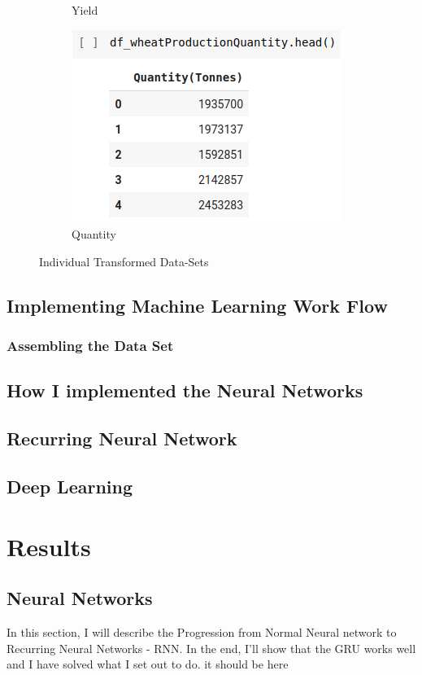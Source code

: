 \documentclass[
]{thesis-ekf}
\begin{document}
\begin{figure}
\begin{subfigure}{.25\textwidth}
		\caption{Yield}
		\label{fig:sub3}
	\end{subfigure}
	\begin{subfigure}{.24\textwidth}
		\centering
		\includegraphics[width=.4\linewidth]{fig/quantityTonnes.png}
		\caption{Quantity}
		\label{fig:sub4}
	\end{subfigure}

	\caption{Individual Transformed Data-Sets}
	\label{fig:heads}
\end{figure}



\section{Implementing Machine Learning Work Flow}





\subsection{Assembling the Data Set}
\section{How I implemented the Neural Networks}
\section{Recurring Neural Network}
\section{Deep Learning}

\chapter{Results}
\section{Neural Networks}
In this section, I will describe the Progression from Normal Neural network to Recurring Neural Networks - RNN. In the end, I'll show that the GRU works well and I have solved what I set out to do. 
it should be here
\end{document}
